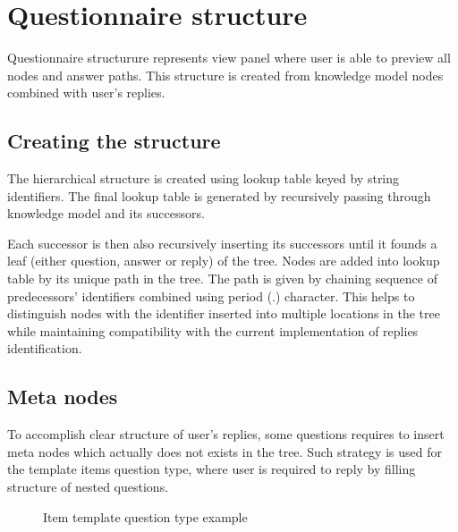 \section{Questionnaire structure}\label{sec:questionnaire-structure}

Questionnaire structurure represents view panel where user is able to preview all nodes and answer paths.
This structure is created from knowledge model nodes combined with user's replies.

\subsection{Creating the structure}

The hierarchical structure is created using lookup table keyed by string identifiers.
The final lookup table is generated by recursively passing through knowledge model and its successors.

Each successor is then also recursively inserting its successors until it founds a leaf (either question, answer or reply) of the tree.
Nodes are added into lookup table by its unique path in the tree.
The path is given by chaining sequence of predecessors' identifiers combined using period (.) character.
This helps to distinguish nodes with the identifier inserted into multiple locations in the tree while maintaining compatibility with the current implementation of replies identification.

\subsection{Meta nodes}

To accomplish clear structure of user's replies, some questions requires to insert meta nodes which actually does not exists in the tree.
Such strategy is used for the template items question type, where user is required to reply by filling structure of nested questions.

\begin{figure}[H]
    \caption{Item template question type example}\label{fig:item-template}
\end{figure}

